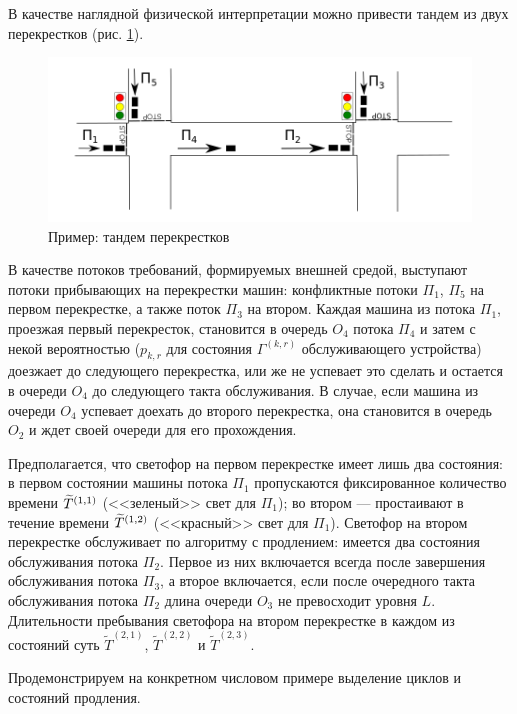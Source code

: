 \documentclass[a4paper,12pt,russian]{extarticle}
\newcommand{\ga}[1]{\Gamma^{\left( #1 \right)} }
\begin{document}
В качестве наглядной физической интерпретации можно привести тандем из двух перекрестков (рис. \ref{crossroads}).
\begin{figure}[h]
\includegraphics[scale=0.5]{Crossroads.png} 
\caption{Пример: тандем перекрестков}
\label{crossroads}
\end{figure}
В качестве потоков требований, формируемых внешней средой, выступают потоки прибывающих на перекрестки машин: конфликтные потоки $\Pi_1$, $\Pi_5$ на первом перекрестке, а также поток $\Pi_3$ на втором. Каждая машина из потока $\Pi_1$, проезжая первый перекресток, становится в очередь $O_4$ потока $\Pi_4$ и затем с некой вероятностью ($p_{k,r}$ для состояния $\ga{k,r}$ обслуживающего устройства) доезжает до следующего перекрестка, или же не успевает это сделать и остается в очереди $O_4$ до следующего такта обслуживания. В случае, если машина из очереди $O_4$ успевает доехать до второго перекрестка, она становится в очередь $O_2$ и ждет своей очереди для его прохождения.

Предполагается, что светофор на первом перекрестке имеет лишь два состояния: в первом состоянии машины потока $\Pi_1$ пропускаются фиксированное количество времени $\widetilde T^{\left(1,1\right)}$ (<<зеленый>> свет для $\Pi_1$); во втором --- простаивают в течение времени $\widetilde T^{\left(1,2\right)}$ (<<красный>> свет для $\Pi_1$). Светофор на втором перекрестке обслуживает по алгоритму с продлением: имеется два состояния обслуживания потока $\Pi_2$. Первое из них включается всегда после завершения обслуживания потока $\Pi_3$, а второе включается, если после очередного такта обслуживания потока $\Pi_2$ длина очереди $O_3$ не превосходит уровня $L$.
Длительности пребывания светофора на втором перекрестке в каждом из состояний суть $\widetilde T^{(2,1)}$, $\widetilde T^{(2,2)}$ и $\widetilde T^{(2,3)}$.

%
Продемонстрируем на конкретном числовом примере выделение циклов и состояний продления.
 
\end{document}
